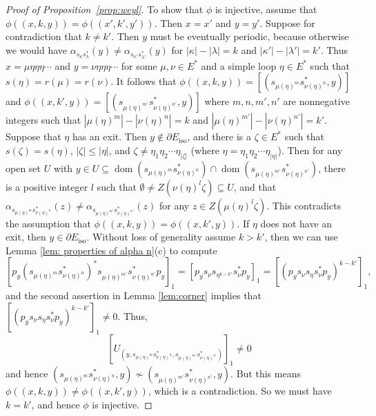 \documentclass[12pt, a4paper]{amsart}
\numberwithin{equation}{section}
\theoremstyle{definition}
\theoremstyle{remark}
\begin{document}
\begin{proof}[Proof of Proposition~\ref{prop:weyl}]
To show that $\phi$ is injective, assume that 
$\phi((x,k,y))=\phi((x',k',y'))$. Then $x=x'$ and $y=y'$. Suppose for 
contradiction that $k\ne k'$. Then $y$ must be eventually periodic, because 
otherwise we would have $\alpha_{s_\kappa s_\lambda^*}(y)\ne 
\alpha_{s_{\kappa'}s_{\lambda'}^*}(y)$ for $|\kappa|-|\lambda|=k$ and $|\kappa'|-|\lambda'|=k'$. 
Thus $x=\mu \eta\eta\eta\cdots$ and 
$y=\nu\eta\eta\eta\cdots$ for some $\mu,\nu\in E^*$ and a simple loop $\eta\in E^*$ 
such that $s(\eta)=r(\mu)=r(\nu)$. It follows that 
$\phi((x,k,y))=[(s_{\mu(\eta)^m}s_{\nu (\eta)^n}^*,y)]$ and 
$\phi((x,k',y))=[(s_{\mu(\eta)^{m'}}s_{\nu (\eta)^{n'}}^*,y)]$ where 
$m,n,m',n'$ are nonnegative integers such that $|\mu 
(\eta)^m|-|\nu(\eta)^n|=k$ and $|\mu (\eta)^{m'}|-|\nu(\eta)^{n'}|=k'$. 
Suppose that $\eta$ has an exit. Then $y\notin\partial E_{{\operatorname{iso}}}$, and there is a 
$\zeta\in E^*$ such that $s(\zeta)=s(\eta)$, $|\zeta|\le |\eta|$, and 
$\zeta\ne \eta_1\eta_2\cdots \eta_{|\zeta|}$ (where $\eta=\eta_1\eta_2\cdots 
\eta_{|\eta|}$). Then for any open set $U$ with $y\in 
U\subseteq{{\operatorname{dom}}}(s_{\mu(\eta)^m}s_{\nu 
(\eta)^n}^*)\cap{{\operatorname{dom}}}(s_{\mu(\eta)^{m'}}s_{\nu (\eta)^{n'}}^*)$, there is a positive 
integer $l$ such that $\emptyset\ne Z(\nu(\eta)^l\zeta)\subseteq U$, and that 
$\alpha_{s_{\mu(\eta)^m}s_{\nu (\eta)^n}^*}(z)\ne 
\alpha_{s_{\mu(\eta)^{m'}}s_{\nu (\eta)^{n'}}^*}(z)$ for any $z\in 
Z(\mu(\eta)^l\zeta)$. This contradicts the assumption that 
$\phi((x,k,y))=\phi((x,k',y))$. If $\eta$ does not have an exit, then 
$y\in\partial E_{{\operatorname{iso}}}$. Without loss of generality assume $k > k'$, then we can use Lemma \ref{lem: properties of alpha n}(c) to compute
\[
[p_y(s_{\mu(\eta)^m}s_{\nu (\eta)^n}^*)^*s_{\mu(\eta)^{m'}}s_{\nu 
(\eta)^{n'}}^*p_y]_1=[p_ys_{\nu}s_{\eta^{k-k'}}s_{\nu}^*p_y]_1=[(p_ys_{\nu}s_{\eta}s_{\nu}^*p_y)^{k-k'}]_1,
\]
and the second assertion in Lemma \ref{lem:corner} implies that 
$[(p_ys_{\nu}s_{\eta}s_{\nu}^*p_y)^{k-k'}]_1\neq 0$. 
Thus, 
\[
[U_{(y , s_{\mu(\eta)^m}s_{\nu (\eta)^n}^* , s_{\mu(\eta)^{m'}}s_{\nu 
(\eta)^{n'}}^*)}]_1 \neq 0
\]
and hence $(s_{\mu(\eta)^m}s_{\nu (\eta)^n}^*,y) \not\sim 
(s_{\mu(\eta)^{m'}}s_{\nu (\eta)^{n'}}^*,y)$. But this means 
$\phi((x,k,y))\not=\phi((x,k',y))$, which is a contradiction. So we must have 
$k=k'$, and hence $\phi$ is injective.
	

\end{proof}
\end{document}

